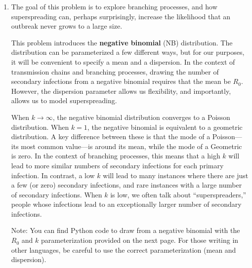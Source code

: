 \documentclass[11pt]{article}
\begin{document}
\begin{enumerate}
\item The goal of this problem is to explore branching processes, and how superspreading can, perhaps surprisingly, increase the likelihood that an outbreak never grows to a large size.

This problem introduces the {\bf negative binomial} (NB) distribution. The distribution can be parameterized a few different ways, but for our purposes, it will be convenient to specify a mean and a dispersion. In the context of transmission chains and branching processes, drawing the number of secondary infections from a negative binomial requires that the mean be $R_0$. However, the dispersion parameter allows us flexibility, and importantly, allows us to model superspreading. 

When $k \to \infty$, the negative binomial distribution converges to a Poisson distribution. When $k = 1$, the negative binomial is equivalent to a geometric distribution. A key difference between these is that the mode of a Poisson---its most common value---is around its mean, while the mode of a Geometric is zero. In the context of branching processes, this means that a high $k$ will lead to more similar numbers of secondary infections for each primary infection. In contrast, a low $k$ will lead to many instances where there are just a few (or zero) secondary infections, and rare instances with a large number of secondary infections. When $k$ is low, we often talk about ``superspreaders,'' people whose infections lead to an exceptionally larger number of secondary infections. 

Note: You can find Python code to draw from a negative binomial with the $R_0$ and $k$ parameterization provided on the next page. For those writing in other languages, be careful to use the correct parameterization (mean and dispersion).


\end{enumerate}
\end{document}
